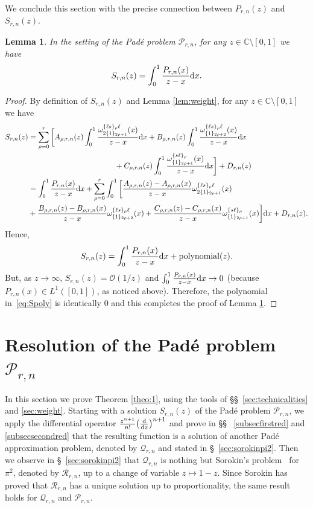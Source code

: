 \documentclass[reqno,12pt]{amsart}
\numberwithin{equation}{section}
\newtheorem{lem}{Lemma}
\theoremstyle{remark}
\def\om{\omega}
\def\dd{\textup{d}}
\newcommand{\Prn}{\mathcal{P}_{r,n}}
\newcommand{\Qrn}{\mathcal{Q}_{r,n}}
\newcommand{\soro}{\mathcal{R}_{r,n}}
\begin{document}
We conclude this section with the precise connection between $ P_{r,n}(z)$ and $S_{r,n}(z)$.
\begin{lem} \label{lem:3} 
In the setting of the Pad\'e problem $\mathcal{P}_{r,n}$, for any $z\in \mathbb C \setminus [0,1]$ 
we have
$$
S_{r,n}(z)=\int_0^1 \frac{P_{r,n}(x)}{z-x} \dd x.
$$
\end{lem}
\begin{proof} By definition of $S_{r,n}(z)$ and Lemma \ref{lem:weight}, for any $z\in \mathbb C \setminus [0,1]$  we have
\begin{align*}
S_{r,n}(z)&=\sum_{\rho=0}^r \bigg[ A_{\rho,r,n}(z) \int_0^1 \frac{\om_{2\{1\}_{2\rho+1}}^{\{\ell s\}_\rho\ell}(x)}{z-x} \dd x
+ B_{\rho,r,n}(z) \int_0^1\frac{\om_{\{1\}_{2\rho+2}}^{\{\ell s\}_\rho\ell}(x)}{z-x} \dd x
\\ & \hspace{4cm}+C_{\rho,r,n}(z)
\int_0^1\frac{\om_{\{1\}_{2\rho+1}}^{\{s\ell\}_\rho}(x)}{z-x} \dd x\bigg] + D_{r,n}(z)
\\ &= \int_0^1 \frac{P_{r,n}(x)}{z-x} \dd x + \sum_{\rho=0}^r \int_0^1 
\bigg[\frac{A_{\rho,r,n}(z)-A_{\rho,r,n}(x)}{z-x}\om_{2\{1\}_{2\rho+1}}^{\{\ell s\}_\rho\ell}(x) 
\\&+ 
\frac{B_{\rho,r,n}(z)-B_{\rho,r,n}(x)}{z-x}\om_{\{1\}_{2\rho+2}}^{\{\ell s\}_\rho\ell}(x) + 
\frac{C_{\rho,r,n}(z)-C_{\rho,r,n}(x)}{z-x}\om_{\{1\}_{2\rho+1}}^{\{s\ell \}_\rho}(x)
\bigg]\dd x + D_{r,n}(z).
\end{align*}
Hence, 
\begin{equation}\label{eq:Spoly}
S_{r,n}(z)=\int_0^1 \frac{P_{r,n}(x)}{z-x} \dd x + \textup{polynomial}(z) .
\end{equation}
But, as $z\to \infty$, $S_{r,n}(z)=\mathcal{O}(1/z)$ and 
$\int_0^1 \frac{P_{r,n}(x)}{z-x} \dd x \to 0$  (because 
$P_{r,n}(x)\in L^1([0,1])$, as noticed above). Therefore, the polynomial in~\eqref{eq:Spoly} is identically $0$ and 
this completes the proof of Lemma \ref{lem:3}.
\end{proof}




\section{Resolution of the Pad\'e problem $\mathcal{P}_{r,n}$}\label{sec:proofthm1}

In this section we prove Theorem \ref{theo:1}, using the tools of 
\S\S~\ref{sec:technicalities} and \ref{sec:weight}. Starting with a 
solution $S_{r,n}(z)$ of the Pad\'e problem $\Prn$, we apply the differential 
operator $\frac{z^{n+1}}{n!} \big( \frac{ \dd }{\dd z}\big)^{n+1}$ and prove in 
\S\S~ \ref{subsecfirstred} and \ref{subsecsecondred} that the resulting function 
is a solution of another Pad\'e approximation problem, denoted by $\Qrn$ and 
stated in \S~\ref{sec:sorokinpi2}. Then we observe in  \S~\ref{sec:sorokinpi2} 
that $\Qrn$ is nothing but Sorokin's problem~\cite{sorokin1}  for $\pi^2$, denoted 
by $\soro$, up to a change of variable $z\mapsto 1-z$. Since Sorokin has proved 
that $\soro$ has a unique solution up to proportionality, the same result holds for $\Qrn$ and $\Prn$.
\end{document}
